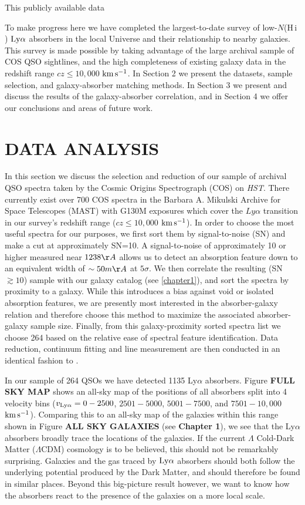 \documentclass[twocolumn,tighten]{aastex62}
\newcommand{\kms}{$\rm km\, s^{-1}$}
\newcommand{\HI}{\mbox{H\,{\sc i}} }
\begin{document}
This publicly available data 

To make progress here we have completed the largest-to-date survey of low-$N$(\HI) $\rm Ly\alpha$ absorbers in the local Universe and their relationship to nearby galaxies. This survey is made possible by taking advantage of the large archival sample of COS QSO sightlines, and the high completeness of existing galaxy data in the redshift range $cz \leq 10,000$ \kms. In Section 2 we present the datasets, sample selection, and galaxy-absorber matching methods. In Section 3 we present and discuss the results of the galaxy-absorber correlation, and in Section 4 we offer our conclusions and areas of future work.



\section{DATA ANALYSIS}
In this section we discuss the selection and reduction of our sample of archival QSO spectra taken by the Cosmic Origins Spectrograph (COS) on \textit{HST}. There currently exist over 700 COS spectra in the Barbara A. Mikulski Archive for Space Telescopes (MAST) with G130M exposures which cover the $Ly\alpha$ transition in our survey's redshift range ($cz \leq 10,000$ \kms). In order to choose the most useful spectra for our purposes, we first sort them by signal-to-noise (SN) and make a cut at approximately SN=10. A signal-to-noise of approximately 10 or higher measured near $1238 \AA$ allows us to detect an absorption feature down to an equivalent width of $\sim 50 m\AA$ at $5\sigma$. We then correlate the resulting (SN$\gtrsim 10$) sample with our galaxy catalog (see \ref{chapter1}), and sort the spectra by proximity to a galaxy. While this introduces a bias against void or isolated absorption features, we are presently most interested in the absorber-galaxy relation and therefore choose this method to maximize the associated absorber-galaxy sample size. Finally, from this galaxy-proximity sorted spectra list we choose 264 based on the relative ease of spectral feature identification. Data reduction, continuum fitting and line measurement are then conducted in an identical fashion to \cite{french2017}.


In our sample of 264 QSOs we have detected 1135 Ly$\alpha$ absorbers. Figure \textbf{FULL SKY MAP} shows an all-sky map of the positions of all absorbers split into 4 velocity bins ($v_{\rm Ly\alpha} = 0 - 2500$, $2501 - 5000$, $5001 - 7500$, and $7501 - 10,000$ \kms). Comparing this to an all-sky map of the galaxies within this range shown in Figure \textbf{ALL SKY GALAXIES} (see \textbf{Chapter 1}), we see that the Ly$\alpha$ absorbers broadly trace the locations of the galaxies. If the current $\Lambda$ Cold-Dark Matter ($\Lambda$CDM) cosmology is to be believed, this should not be remarkably surprising. Galaxies and the gas traced by $\rm Ly\alpha$ absorbers should both follow the underlying potential produced by the Dark Matter, and should therefore be found in similar places. Beyond this big-picture result however, we want to know how the absorbers react to the presence of the galaxies on a more local scale.
\end{document}
